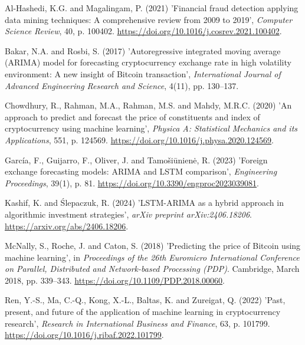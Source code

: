 \documentclass[12pt,a4paper]{report}
\begin{document}
\vspace{0.3cm}
\noindent Al-Hashedi, K.G. and Magalingam, P. (2021) 'Financial fraud detection applying data mining techniques: A comprehensive review from 2009 to 2019', \textit{Computer Science Review}, 40, p. 100402. \url{https://doi.org/10.1016/j.cosrev.2021.100402}.

\vspace{0.3cm}
\noindent Bakar, N.A. and Rosbi, S. (2017) 'Autoregressive integrated moving average (ARIMA) model for forecasting cryptocurrency exchange rate in high volatility environment: A new insight of Bitcoin transaction', \textit{International Journal of Advanced Engineering Research and Science}, 4(11), pp. 130--137.

\vspace{0.3cm}
\noindent Chowdhury, R., Rahman, M.A., Rahman, M.S. and Mahdy, M.R.C. (2020) 'An approach to predict and forecast the price of constituents and index of cryptocurrency using machine learning', \textit{Physica A: Statistical Mechanics and its Applications}, 551, p. 124569. \url{https://doi.org/10.1016/j.physa.2020.124569}.

\vspace{0.3cm}
\noindent García, F., Guijarro, F., Oliver, J. and Tamošiūnienė, R. (2023) 'Foreign exchange forecasting models: ARIMA and LSTM comparison', \textit{Engineering Proceedings}, 39(1), p. 81. \url{https://doi.org/10.3390/engproc2023039081}.

\vspace{0.3cm}
\noindent Kashif, K. and Ślepaczuk, R. (2024) 'LSTM-ARIMA as a hybrid approach in algorithmic investment strategies', \textit{arXiv preprint arXiv:2406.18206}. \url{https://arxiv.org/abs/2406.18206}.

\vspace{0.3cm}
\noindent McNally, S., Roche, J. and Caton, S. (2018) 'Predicting the price of Bitcoin using machine learning', in \textit{Proceedings of the 26th Euromicro International Conference on Parallel, Distributed and Network-based Processing (PDP)}. Cambridge, March 2018, pp. 339--343. \url{https://doi.org/10.1109/PDP.2018.00060}.

\vspace{0.3cm}
\noindent Ren, Y.-S., Ma, C.-Q., Kong, X.-L., Baltas, K. and Zureigat, Q. (2022) 'Past, present, and future of the application of machine learning in cryptocurrency research', \textit{Research in International Business and Finance}, 63, p. 101799. \url{https://doi.org/10.1016/j.ribaf.2022.101799}.
\end{document}
